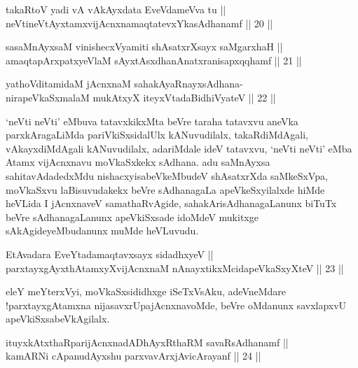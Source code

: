 \begin{shl}
takaRtoV yadi vA vAkAyxdata EveVdameVva tu || \\
neVtineVtAyxtamxvijAcnxnamaqtatevxYkasAdhanamf \hfill || 20 || 
\end{shl}
				
\begin{shl}
sasaMnAyxsaM vinishecxVyamiti shAsatxrXsayx saMgarxhaH || \\
amaqtapArxpatxyeV\s laM sAyxtAsxdhanAnatxranisapxqqhamf \hfill || 21 ||  
\end{shl}
				
\begin{shl}
yathoVditamidaM jAcnxnaM sahakAyaRnayxsAdhana-\\
nirapeVkaSxmalaM mukAtxyX iteyxVtadaBidhiVyateV \hfill || 22 ||  
\end{shl}

\begin{artha}
`neVti neVti' eMbuva tatavxkikxMta beVre taraha tatavxvu aneVka parxkAragaLiMda pariVkiSxsidalUlx kANuvudilalx, takaRdiMdAgali, vAkayxdiMdAgali kANuvudilalx, adariMdale ideV tatavxvu, `neVti neVti' eMba Atamx vijAcnxnavu moVkaSxkekx sAdhana. adu saMnAyxsa sahitavAdadedxMdu nishacxyisabeVkeMbudeV shAsatxrXda saMkeSxVpa, moVkaSxvu laBisuvudakekx beVre sAdhanagaLa apeVkeSxyilalxde hiMde heVLida I jAcnxnaveV samathaRvAgide, sahakArisAdhanagaLanunx biTuTx beVre sAdhanagaLanunx apeVkiSxsade idoMdeV mukitxge sAkAgideyeMbudanunx muMde heVLuvudu.
\end{artha}


\begin{shl}
EtAvadara EveYtadamaqtavxsayx sidadhxyeV || \\
parxtayxgAyxthAtamxyXvijAcnxnaM nAnayxtikxMcidapeVkaSxyXteV \hfill || 23 ||  
\end{shl}

\begin{artha}
eleY meYterxVyi, moVkaSxsididhxge iSeTxVsAku, adeVneMdare !\break parxtayxgAtamxna nijasavxrUpajAcnxnavoMde, beVre oMdanunx savxlapxvU apeVkiSxsabeVkAgilalx.
\end{artha}


\begin{shl}
ituyxkAtxthaRparijAcnxnadADhAyxRthaRM savaRsAdhanamf || \\
kamARNi cApanudAyx\s \s shu parxvavArxjAvicArayanf \hfill || 24 ||  
\end{shl}

